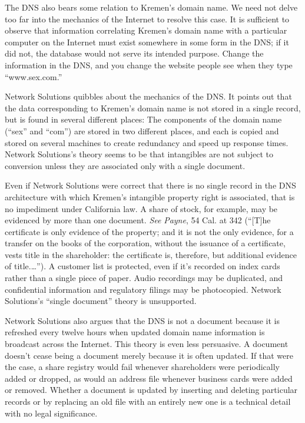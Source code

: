 The DNS also bears some relation to Kremen's domain name. We need not delve too
far into the mechanics of the Internet to resolve this case. It is sufficient
to observe that information correlating Kremen's domain name with a particular
computer on the Internet must exist somewhere in some form in the DNS; if it
did not, the database would not serve its intended purpose. Change the
information in the DNS, and you change the website people see when they type
``www.sex.com.''

Network Solutions quibbles about the mechanics of the DNS. It points out that
the data corresponding to Kremen's domain name is not stored in a single
record, but is found in several different places: The components of the domain
name (``sex'' and ``com'') are stored in two different places, and each is
copied and stored on several machines to create redundancy and speed up
response times. Network Solutions's theory seems to be that intangibles are not
subject to conversion unless they are associated only with a single document.

Even if Network Solutions were correct that there is no single record in the DNS
architecture with which Kremen's intangible property right is associated, that
is no impediment under California law. A share of stock, for example, may be
evidenced by more than one document. \textit{See} \textit{Payne}, 54 Cal. at
342 (``[T]he certificate is only evidence of the property; and it is not the
only evidence, for a transfer on the books of the corporation, without the
issuance of a certificate, vests title in the shareholder: the certificate is,
therefore, but additional evidence of title.\ldots''). A customer list is
protected, even if it's recorded on index cards rather than a single piece of
paper. Audio recordings may be duplicated, and confidential information and
regulatory filings may be photocopied. Network Solutions's ``single document''
theory is unsupported.

Network Solutions also argues that the DNS is not a document because it is
refreshed every twelve hours when updated domain name information is broadcast
across the Internet. This theory is even less persuasive. A document doesn't
cease being a document merely because it is often updated. If that were the
case, a share registry would fail whenever shareholders were periodically added
or dropped, as would an address file whenever business cards were added or
removed. Whether a document is updated by inserting and deleting particular
records or by replacing an old file with an entirely new one is a technical
detail with no legal significance.

